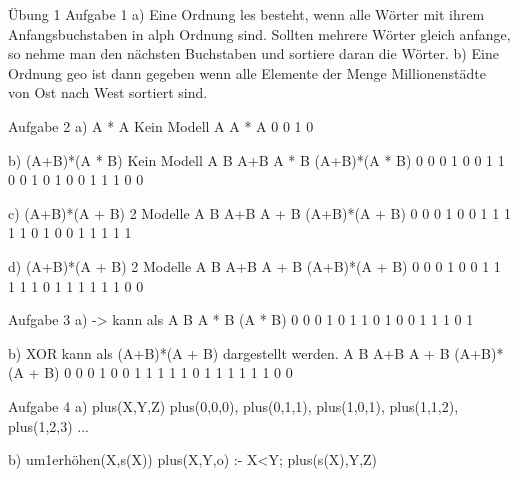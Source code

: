 Übung 1 
Aufgabe 1
a) Eine Ordnung les besteht, wenn alle Wörter  mit ihrem Anfangsbuchstaben in alph Ordnung sind.
   Sollten mehrere Wörter gleich anfange, so nehme man den nächsten Buchstaben und sortiere daran 
   die Wörter.
b) Eine Ordnung geo ist dann gegeben wenn alle Elemente der Menge Millionenstädte von Ost nach 
   West sortiert sind.
 
  
Aufgabe 2
a) A * \lnot A
Kein Modell
A	A * \lnot A
0	0
1	0

b) (A+B)*(\lnot A * \lnot B)
Kein Modell
A	B	A+B	\lnot A * \lnot B	(A+B)*(\lnot A * \lnot B)
0	0	0	1	0
0	1	1	0	0
1	0	1	0	0
1	1	1	0	0

c) (A+B)*(\lnot A + B)
2 Modelle
A	B	A+B	\lnot A + B	(A+B)*(\lnot A + B)
0	0	0	1	0
0	1	1	1	1
1	0	1	0	0
1	1	1	1	1

d) (A+B)*(\lnot A + \lnot B)
2 Modelle
A	B	A+B	\lnot A + \lnot B	(A+B)*(\lnot A + \lnot B)
0	0	0	1	0
0	1	1	1	1
1	0	1	1	1
1	1	1	0	0


Aufgabe 3
a) -> kann als
A	B	\lnot A * B	\lnot (\lnot A * B)
0	0	0	1
0	1	1	0
1	0	0	1
1	1	0	1

b) XOR kann als (A+B)*(\lnot A + \lnot B) dargestellt werden.
A	B	A+B	\lnot A + \lnot B	(A+B)*(\lnot A + \lnot B)
0	0	0	1	0
0	1	1	1	1
1	0	1	1	1
1	1	1	0	0

Aufgabe 4
a) plus(X,Y,Z)
	plus(0,0,0), plus(0,1,1), plus(1,0,1), plus(1,1,2), plus(1,2,3) ...
	
b) um1erhöhen(X,s(X))
	plus(X,Y,o) :- X<Y; plus(s(X),Y,Z)